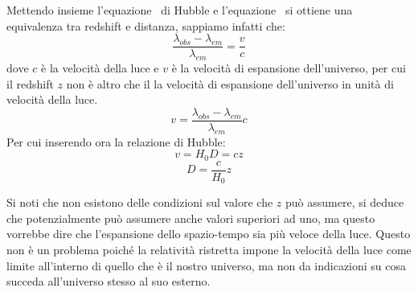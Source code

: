 Mettendo insieme l'equazione~ di Hubble e l'equazione~ si ottiene una equivalenza tra redshift e distanza, sappiamo infatti che:
\[
    \frac{\lambda_{obs} - \lambda_{em}}{\lambda_{em}} = \frac{v}{c}
\]
dove $c$ è la velocità della luce e $v$ è la velocità di espansione dell'universo, per cui il redshift $z$ non è altro che il la velocità di espansione dell'universo in unità di velocità della luce.
\[
    v = \frac{\lambda_{obs} - \lambda_{em}}{\lambda_{em}} c
\]
Per cui inserendo ora la relazione di Hubble:
\[
    v = H_0 D = c z
\]
\begin{equation}\label{eq:ditanza-redshift}
    D = \frac{c}{H_0}z
\end{equation}

Si noti che non esistono delle condizioni sul valore che $z$ può assumere, si deduce che potenzialmente può assumere anche valori superiori ad uno, ma questo vorrebbe dire che l'espansione dello spazio-tempo sia più veloce della luce. Questo non è un problema poiché la relatività ristretta impone la velocità della luce come limite all'interno di quello che è il nostro universo, ma non da indicazioni su cosa succeda all'universo stesso al suo esterno.